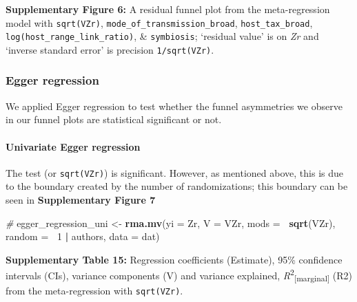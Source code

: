 \documentclass[
]{article}
\newenvironment{Shaded}{\begin{snugshade}}{\end{snugshade}}
\newcommand{\CommentTok}[1]{\textcolor[rgb]{0.56,0.35,0.01}{\textit{#1}}}
\newcommand{\DataTypeTok}[1]{\textcolor[rgb]{0.13,0.29,0.53}{#1}}
\newcommand{\DecValTok}[1]{\textcolor[rgb]{0.00,0.00,0.81}{#1}}
\newcommand{\KeywordTok}[1]{\textcolor[rgb]{0.13,0.29,0.53}{\textbf{#1}}}
\newcommand{\NormalTok}[1]{#1}
\newcommand{\OperatorTok}[1]{\textcolor[rgb]{0.81,0.36,0.00}{\textbf{#1}}}
\newcommand{\StringTok}[1]{\textcolor[rgb]{0.31,0.60,0.02}{#1}}
\begin{document}
\textbf{Supplementary Figure 6:} A residual funnel plot from the
meta-regression model with \texttt{sqrt(VZr)},
\texttt{mode\_of\_transmission\_broad}, \texttt{host\_tax\_broad},
\texttt{log(host\_range\_link\_ratio)}, \& \texttt{symbiosis}; `residual
value' is on \emph{Zr} and `inverse standard error' is precision
\texttt{1/sqrt(VZr)}.

\hypertarget{egger-regression}{%
\subsubsection{Egger regression}\label{egger-regression}}

We applied Egger regression to test whether the funnel asymmetries we
observe in our funnel plots are statistical significant or not.

\hypertarget{univariate-egger-regression}{%
\paragraph{Univariate Egger
regression}\label{univariate-egger-regression}}

The test (or \texttt{sqrt(VZr)}) is significant. However, as mentioned
above, this is due to the boundary created by the number of
randomizations; this boundary can be seen in \textbf{Supplementary
Figure 7}

\begin{Shaded}
\begin{Highlighting}[]
\CommentTok{# }
\NormalTok{egger_regression_uni <-}\StringTok{ }\KeywordTok{rma.mv}\NormalTok{(}\DataTypeTok{yi =}\NormalTok{ Zr, }\DataTypeTok{V =}\NormalTok{ VZr, }\DataTypeTok{mods =} \OperatorTok{~}\KeywordTok{sqrt}\NormalTok{(VZr), }\DataTypeTok{random =} \OperatorTok{~}\DecValTok{1} \OperatorTok{|}\StringTok{ }
\StringTok{    }\NormalTok{authors, }\DataTypeTok{data =}\NormalTok{ dat)}
\end{Highlighting}
\end{Shaded}

\textbf{Supplementary Table 15:} Regression coefficients (Estimate),
95\% confidence intervals (CIs), variance components (V) and variance
explained, \emph{R}\textsuperscript{2}\textsubscript{{[}marginal{]}}
(R2) from the meta-regression with \texttt{sqrt(VZr)}.
\end{document}
